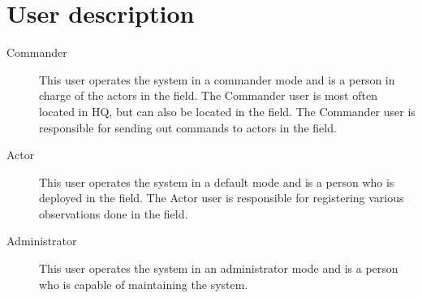 \section{User description}

\begin{description}
  \item[Commander] This user operates the system in a commander mode and is a person in charge of the actors in the field. The Commander user is most often located in HQ, but can also be located in the field. The Commander user is responsible for sending out commands to actors in the field.
  \item[Actor] This user operates the system in a default mode and is a person who is deployed in the field. The Actor user is responsible for registering various observations done in the field.
  \item[Administrator] This user operates the system in an administrator mode and is a person who is capable of maintaining the system.
\end{description}
